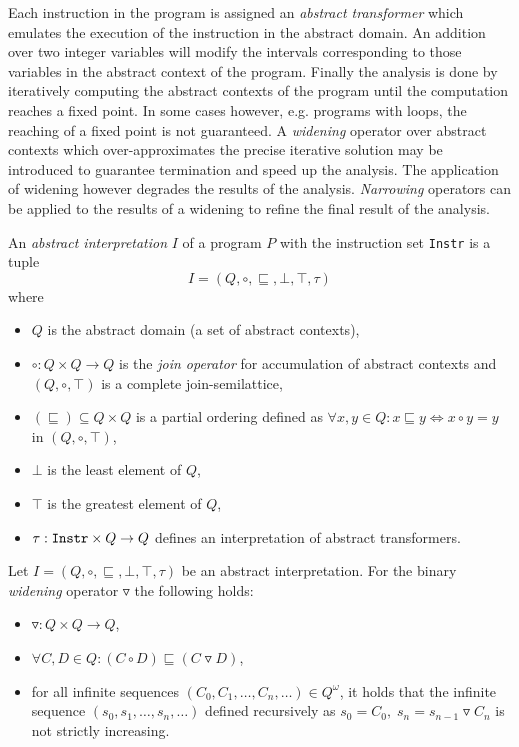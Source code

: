 Each instruction in the program is assigned an \emph{abstract transformer} which emulates the execution of the instruction in the abstract domain. An addition over two integer variables will modify the intervals corresponding to those variables in the abstract context of the program. Finally the analysis is done by iteratively computing the abstract contexts of the program until the computation reaches a fixed point. In some cases however, e.g. programs with loops, the reaching of a fixed point is not guaranteed. A \emph{widening} operator over abstract contexts which over-approximates the precise iterative solution may be introduced to guarantee termination and speed up the analysis. The application of widening however degrades the results of the analysis. \emph{Narrowing} operators can be applied to the results of a widening to refine the final result of the analysis.

\begin{defn}
An \emph{abstract interpretation} $I$ of a program $P$ with the instruction set \texttt{Instr} is a tuple $$I = (Q, \circ, \sqsubseteq, \bot, \top, \tau)$$ where
\begin{itemize}
    \item $Q$ is the abstract domain (a set of abstract contexts),
    \item $\circ: Q \times Q \rightarrow Q$ is the \emph{join operator} for accumulation of abstract contexts and $(Q, \circ, \top)$ is a complete join-semilattice,
    \item $(\sqsubseteq) \subseteq Q \times Q$ is a partial ordering defined as $\forall x, y \in Q: x \sqsubseteq y \Leftrightarrow x \circ y = y$ in $(Q,\circ, \top)$,
    \item $\bot$ is the least element of $Q$,
    \item $\top$ is the greatest element of $Q$,
    \item $\tau: \text{\texttt{Instr}}\times Q \rightarrow Q$ defines an interpretation of abstract transformers.
\end{itemize}
\end{defn}

\begin{defn}
Let $I = (Q, \circ, \sqsubseteq, \bot, \top, \tau)$ be an abstract interpretation. For the binary \emph{widening} operator $\triangledown$ the following holds:
\begin{itemize}
    \item $\triangledown: Q \times Q \rightarrow Q$,
    \item $\forall C,D \in Q: (C \circ D) \sqsubseteq (C \triangledown D)$,
    \item for all infinite sequences $(C_0, C_1, \dots, C_n, \dots) \in Q^\omega$, it holds that the infinite sequence $(s_0, s_1, \dots, s_n, \dots)$ defined recursively as $s_0 = C_0, \; s_n = s_{n-1} \triangledown C_n$ is not strictly increasing.
\end{itemize}
\end{defn}

